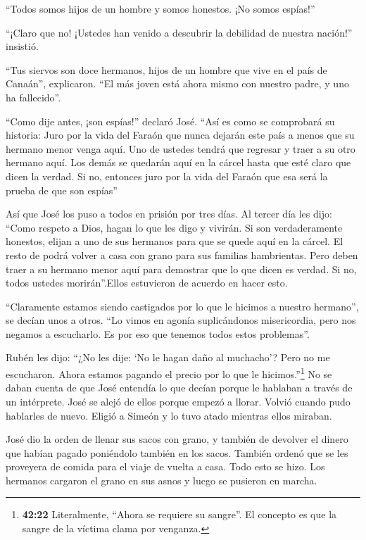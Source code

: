  ``Todos somos hijos de un hombre y somos honestos. ¡No
somos espías!''

 ``¡Claro que no! ¡Ustedes han venido a descubrir la
debilidad de nuestra nación!'' insistió.

 ``Tus siervos son doce hermanos, hijos de un hombre que
vive en el país de Canaán'', explicaron. ``El más joven está ahora mismo
con nuestro padre, y uno ha fallecido''.

 ``Como dije antes, ¡son espías!'' declaró José.
 ``Así es como se comprobará su historia: Juro por la vida
del Faraón que nunca dejarán este país a menos que su hermano menor
venga aquí.  Uno de ustedes tendrá que regresar y traer a
su otro hermano aquí. Los demás se quedarán aquí en la cárcel hasta que
esté claro que dicen la verdad. Si no, entonces juro por la vida del
Faraón que esa será la prueba de que son espías''

 Así que José los puso a todos en prisión por tres días.
 Al tercer día les dijo: ``Como respeto a Dios, hagan lo
que les digo y vivirán.  Si son verdaderamente honestos,
elijan a uno de sus hermanos para que se quede aquí en la cárcel. El
resto de podrá volver a casa con grano para sus familias hambrientas.
 Pero deben traer a su hermano menor aquí para demostrar
que lo que dicen es verdad. Si no, todos ustedes morirán''.Ellos
estuvieron de acuerdo en hacer esto.

 ``Claramente estamos siendo castigados por lo que le
hicimos a nuestro hermano'', se decían unos a otros. ``Lo vimos en
agonía suplicándonos misericordia, pero nos negamos a escucharlo. Es por
eso que tenemos todos estos problemas''.

 Rubén les dijo: ``¿No les dije: `No le hagan daño al
muchacho'? Pero no me escucharon. Ahora estamos pagando el precio por lo
que le hicimos.''\footnote{\textbf{42:22} Literalmente, ``Ahora se
  requiere su sangre''. El concepto es que la sangre de la víctima clama
  por venganza.}  No se daban cuenta de que José entendía
lo que decían porque le hablaban a través de un intérprete.
 José se alejó de ellos porque empezó a llorar. Volvió
cuando pudo hablarles de nuevo. Eligió a Simeón y lo tuvo atado mientras
ellos miraban.

 José dio la orden de llenar sus sacos con grano, y también
de devolver el dinero que habían pagado poniéndolo también en los sacos.
También ordenó que se les proveyera de comida para el viaje de vuelta a
casa. Todo esto se hizo.  Los hermanos cargaron el grano en
sus asnos y luego se pusieron en marcha.

